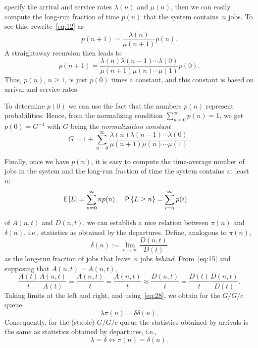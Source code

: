 \documentclass[stochastic-or.tex]{subfiles}
\begin{document}
 specify
the arrival and service rates $\lambda(n)$ and $\mu(n)$, then we can easily compute the long-run fraction of time $p(n)$ that the system contains~$n$ jobs.
To see this, rewrite~\cref{eq:12} as
\begin{equation}\label{eq:25}
 p(n+1) = \frac{\lambda(n)}{\mu(n+1)}p(n).
\end{equation}
A straightaway recursion then leads to
\begin{equation*}
 p(n+1) = \frac{\lambda(n)\lambda(n-1)\cdots \lambda(0)}{\mu(n+1)\mu(n)\cdots \mu(1)}p(0).
\end{equation*}
Thus, $p(n)$, $n\geq 1$, is just $p(0)$ times a constant, and this constant is based on  arrival and service rates.

To determine $p(0)$ we can use the fact that the numbers $p(n)$ represent probabilities.
Hence, from the normalizing condition $\sum_{n=0}^\infty p(n)=1$, we get $p(0) = G^{-1}$ with
$G$ being the \emph{normalization constant}
\begin{equation*}
G = 1+\sum_{n=0}^\infty \frac{\lambda(n)\lambda(n-1)\cdots\lambda(0)}{\mu(n+1)\mu(n)\cdots \mu(1)}.
\end{equation*}

Finally, once we have $p(n)$, it is easy to compute  the time-average number of jobs in the system and the long-run fraction of time the system contains at least~$n$:
\begin{align*}
\,\mathsf{E}\left[L\right] &= \sum_{n=0}^\infty n p(n), & \,\mathsf{P}\left\{L \geq n\right\} &= \sum_{i=n}^\infty p(i).
\end{align*}


 of $A(n,t)$ and $D(n,t)$, we can  establish a nice relation between $\pi(n)$ and $\delta(n)$, i.e.,  statistics as obtained by the departures. Define, analogous to $\pi(n)$,
\begin{equation*}
 \delta(n) := \lim_{t\to\infty} \frac{D(n,t)}{D(t)}
\end{equation*}
as the long-run fraction of jobs that leave~$n$ jobs \emph{behind}.
From~\cref{eq:15} and supposing that $A(n,t) = A(n,t)$,
\begin{equation*}
\frac{A(t)}t \frac{A(n,t)}{A(t)} = \frac{A(n,t)}t = \frac{A(n,t)}{t}\approx \frac{D(n,t)}t
= \frac{D(t)}t \frac{D(n,t)}{D(t)}.
\end{equation*}
Taking limits at the left and right, and using~\cref{eq:28}, we obtain for the $G/G/c$ queue
\begin{equation} \label{eq:36}
 \lambda \pi(n) = \delta \delta(n).
\end{equation}
Consequently, for the (stable)  $G/G/c$ queue  the statistics obtained by arrivals is the same as statistics obtained by departures, i.e.,
\begin{equation} \label{eq:39}
\lambda = \delta \iff \pi(n) = \delta(n).
\end{equation}
\end{document}
